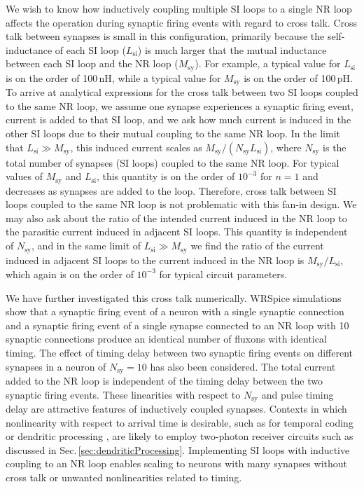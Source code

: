 \documentclass[twocolumn]{article}
\begin{document}
We wish to know how inductively coupling multiple SI loops to a single NR loop affects the operation during synaptic firing events with regard to cross talk. Cross talk between synapses is small in this configuration, primarily because the self-inductance of each SI loop ($L_{\mathrm{si}}$) is much larger that the mutual inductance between each SI loop and the NR loop ($M_{\mathrm{sy}}$). For example, a typical value for $L_{\mathrm{si}}$ is on the order of 100\,nH, while a typical value for $M_{\mathrm{sy}}$ is on the order of 100\,pH. To arrive at analytical expressions for the cross talk between two SI loops coupled to the same NR loop, we assume one synapse experiences a synaptic firing event, current is added to that SI loop, and we ask how much current is induced in the other SI loops due to their mutual coupling to the same NR loop. In the limit that $L_{\mathrm{si}} \gg M_{\mathrm{sy}}$, this induced current scales as $M_{\mathrm{sy}}/(N_{\mathrm{sy}}L_{\mathrm{si}})$, where $N_{\mathrm{sy}}$ is the total number of synapses (SI loops) coupled to the same NR loop. For typical values of $M_{\mathrm{sy}}$ and $L_{\mathrm{si}}$, this quantity is on the order of $10^{-3}$ for $n=1$ and decreases as synapses are added to the loop. Therefore, cross talk between SI loops coupled to the same NR loop is not problematic with this fan-in design. We may also ask about the ratio of the intended current induced in the NR loop to the parasitic current induced in adjacent SI loops. This quantity is independent of $N_{\mathrm{sy}}$, and in the same limit of $L_{\mathrm{si}} \gg M_{\mathrm{sy}}$ we find the ratio of the current induced in adjacent SI loops to the current induced in the NR loop is $M_{\mathrm{sy}}/L_{\mathrm{si}}$, which again is on the order of $10^{-3}$ for typical circuit parameters. 

We have further investigated this cross talk numerically. WRSpice simulations show that a synaptic firing event of a neuron with a single synaptic connection and a synaptic firing event of a single synapse connected to an NR loop with 10 synaptic connections produce an identical number of fluxons with identical timing. The effect of timing delay between two synaptic firing events on different synapses in a neuron of $N_{\mathrm{sy}} = 10$ has also been considered. The total current added to the NR loop is independent of the timing delay between the two synaptic firing events. These linearities with respect to $N_{\mathrm{sy}}$ and pulse timing delay are attractive features of inductively coupled synapses. Contexts in which nonlinearity with respect to arrival time is desirable, such as for temporal coding \cite{thde2001,sase2001} or dendritic processing \cite{brcl2010,haah2015}, are likely to employ two-photon receiver circuits such as discussed in Sec.\,\ref{sec:dendriticProcessing}. Implementing SI loops with inductive coupling to an NR loop enables scaling to neurons with many synapses without cross talk or unwanted nonlinearities related to timing.
 
\end{document}
